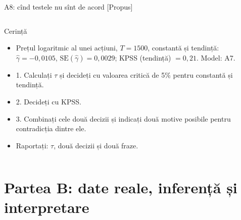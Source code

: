 \begin{frame}{A8: cînd testele nu sînt de acord [Propus]}
\propsub
\itemsize{\scriptsize}
\begin{columns}[T]
\begin{column}{\taskw}
\begin{block}{Cerință}
\begin{itemize}
    \item Prețul logaritmic al unei acțiuni, $T = 1500$, constantă și tendință: $\hat\gamma = -0{,}0105$, $\mathrm{SE}(\hat\gamma) = 0{,}0029$; KPSS (tendință) $= 0{,}21$. Model: A7.
    \item 1. Calculați $\tau$ și decideți cu valoarea critică de 5\% pentru constantă și tendință.
    \item 2. Decideți cu KPSS.
    \item 3. Combinați cele două decizii și indicați două motive posibile pentru contradicția dintre ele.
    \item Raportați: $\tau$, două decizii și două fraze.
\end{itemize}
\end{block}
\end{column}
\begin{column}{\solw}
\end{column}
\end{columns}
\end{frame}


\section{Partea B: date reale, inferență și interpretare}

